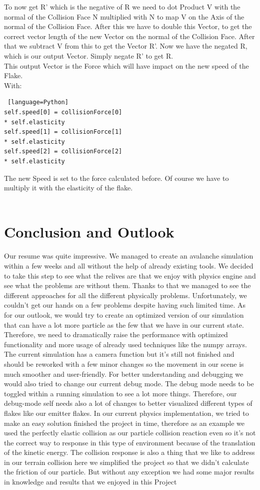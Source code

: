 \documentclass{sig-alternate-05-2015}
\begin{document}
 To now get R' which is the negative of R we need to dot Product V with the normal of the Collision Face N multiplied with N to map V on the Axis of the normal of the Collision Face. After this we have to double this Vector, to get the correct vector length of the new Vector on the normal of the Collision Face. After that we subtract V from this to get the Vector R'. Now we have the negated R, which is our output Vector. Simply negate R' to get R. \\
This output Vector is the Force which will have impact on the new speed of the Flake. \\
With: 
\begin{lstlisting} [language=Python]
self.speed[0] = collisionForce[0] 
* self.elasticity
self.speed[1] = collisionForce[1] 
* self.elasticity
self.speed[2] = collisionForce[2] 
* self.elasticity
\end{lstlisting}
The new Speed is set to the force calculated before. Of course we have to multiply it with the elasticity of the flake. \\
\\

\section{Conclusion and Outlook}
Our resume was quite impressive. We managed to create an avalanche simulation within a few weeks and all without the help of already existing tools. We decided to take this step to see what the relives are that we enjoy with physics engine and see what the problems are without them. Thanks to that we managed to see the different approaches for all the different physically problems. Unfortunately, we couldn't get our hands on a few problems despite having such limited time. As for our outlook, we would try to create an optimized version of our simulation that can have a lot more particle as the few that we have in our current state. Therefore, we need to dramatically raise the performance with optimized functionality and more usage of already used techniques like the numpy arrays. The current simulation has a camera function but it's still not finished and should be reworked with a few minor changes so the movement in our scene is much smoother and user-friendly. For better understanding and debugging we would also tried to change our current debug mode. The debug mode needs to be toggled within a running simulation to see a lot more things. Therefore, our debug-mode self needs also a lot of changes to better visualized different types of flakes like our emitter flakes. In our current physics implementation, we tried to make an easy solution finished the project in time, therefore as an example we used the perfectly elastic collision as our particle collision reaction even so it's not the correct way to response in this type of environment because of the translation of the kinetic energy. The collision response is also a thing that we like to address in our terrain collision here we simplified the project so that we didn't calculate the friction of our particle. But without any exception we had some major results in knowledge and results that we enjoyed in this Project 



 
\end{document}
